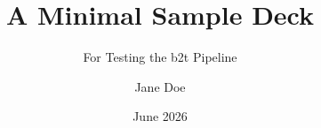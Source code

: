 \documentclass{beamer}
\title{A Minimal Sample Deck}
\subtitle{For Testing the b2t Pipeline}
\author{Jane Doe}
\institute{Department of Examples}
\date{June 2026}
\begin{document}
\begin{frame}
  \titlepage
\end{frame}




\end{document}
